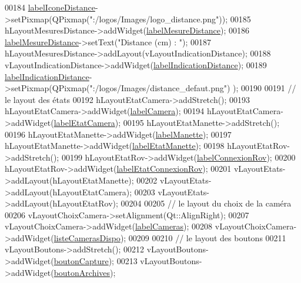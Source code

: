 \begin{DoxyCode}
00184     \hyperlink{class_i_h_m_rov_ae8e7eef50b55104e1490191e3bdcb8d9}{labelIconeDistance}->setPixmap(QPixmap(\textcolor{stringliteral}{":/logos/Images/logo\_distance.png"}));
00185     hLayoutMesuresDistance->addWidget(\hyperlink{class_i_h_m_rov_a39ff04b1880aa20941716cf7a6e1b8d8}{labelMesureDistance});
00186     \hyperlink{class_i_h_m_rov_a39ff04b1880aa20941716cf7a6e1b8d8}{labelMesureDistance}->setText(\textcolor{stringliteral}{"Distance (cm) : "});
00187     hLayoutMesuresDistance->addLayout(vLayoutIndicationDistance);
00188     vLayoutIndicationDistance->addWidget(\hyperlink{class_i_h_m_rov_a14e8fc8b6a1f95e974b550fd54088581}{labelIndicationDistance});
00189     \hyperlink{class_i_h_m_rov_a14e8fc8b6a1f95e974b550fd54088581}{labelIndicationDistance}->setPixmap(QPixmap(\textcolor{stringliteral}{":/logos/Images/distance\_defaut.png"})
      );
00190 
00191     \textcolor{comment}{// le layout des états}
00192     hLayoutEtatCamera->addStretch();
00193     hLayoutEtatCamera->addWidget(\hyperlink{class_i_h_m_rov_a01cfcfe3e5744cd977bb0416d4e3debe}{labelCamera});
00194     hLayoutEtatCamera->addWidget(\hyperlink{class_i_h_m_rov_a2ec8f0e6175a73377e4b7e96b4f29b95}{labelEtatCamera});
00195     hLayoutEtatManette->addStretch();
00196     hLayoutEtatManette->addWidget(\hyperlink{class_i_h_m_rov_a93259ab27f1eeeacbfe3048a58f475b1}{labelManette});
00197     hLayoutEtatManette->addWidget(\hyperlink{class_i_h_m_rov_ad62586ec4cef61ef851626515fd0f72a}{labelEtatManette});
00198     hLayoutEtatRov->addStretch();
00199     hLayoutEtatRov->addWidget(\hyperlink{class_i_h_m_rov_ac52c67da33e4d4c40b4c485c09452142}{labelConnexionRov});
00200     hLayoutEtatRov->addWidget(\hyperlink{class_i_h_m_rov_a83a10634509cf2d32a0bcee159eecbc3}{labelEtatConnexionRov});
00201     vLayoutEtats->addLayout(hLayoutEtatManette);
00202     vLayoutEtats->addLayout(hLayoutEtatCamera);
00203     vLayoutEtats->addLayout(hLayoutEtatRov);
00204 
00205     \textcolor{comment}{// le layout du choix de la caméra}
00206     vLayoutChoixCamera->setAlignment(Qt::AlignRight);
00207     vLayoutChoixCamera->addWidget(\hyperlink{class_i_h_m_rov_aebce213bf418897dc8a775cfc180ff59}{labelCameras});
00208     vLayoutChoixCamera->addWidget(\hyperlink{class_i_h_m_rov_a9b9e5631b8d9b6a9801a6faac8cba0f0}{listeCamerasDispo});
00209 
00210     \textcolor{comment}{// le layout des boutons}
00211     vLayoutBoutons->addStretch();
00212     vLayoutBoutons->addWidget(\hyperlink{class_i_h_m_rov_a149c634582225cff29b6c8555eb7ba85}{boutonCapture});
00213     vLayoutBoutons->addWidget(\hyperlink{class_i_h_m_rov_a1a0c3460e0b9e9c4a1adc54f7f229307}{boutonArchives});

\end{DoxyCode}

